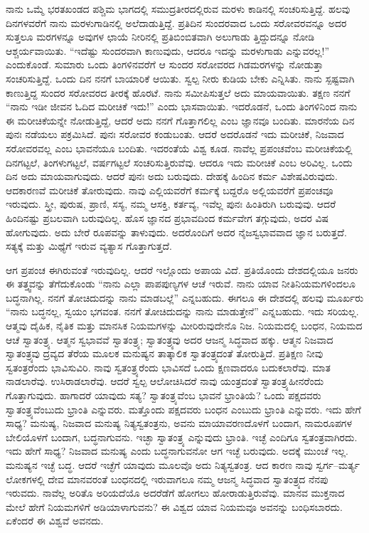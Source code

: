 ನಾನು ಒಮ್ಮೆ ಭರತಖಂಡದ ಪಶ್ಚಿಮ ಭಾಗದಲ್ಲಿ ಸಮುದ್ರತೀರದಲ್ಲಿರುವ ಮರಳು ಕಾಡಿನಲ್ಲಿ ಸಂಚರಿಸುತ್ತಿದ್ದೆ. ಹಲವು ದಿನಗಳವರೆಗೆ ನಾನು ಮರಳುಗಾಡಿನಲ್ಲಿ ಅಲೆದಾಡುತ್ತಿದ್ದೆ. ಪ್ರತಿದಿನ ಸುಂದರವಾದ ಒಂದು ಸರೋವರವನ್ನೂ ಅದರ ಸುತ್ತಲೂ ಮರಗಳನ್ನೂ ಅವುಗಳ ಛಾಯೆ ನೀರಿನಲ್ಲಿ ಪ್ರತಿಬಿಂಬಿತವಾಗಿ ಅಲುಗಾಡು ತ್ತಿದ್ದುದನ್ನೂ ನೋಡಿ ಆಶ್ಚರ್ಯವಾಯಿತು. “ಇದೆಷ್ಟು ಸುಂದರವಾಗಿ ಕಾಣುವುದು, ಆದರೂ ಇದನ್ನು ಮರಳುಗಾಡು ಎನ್ನುವರಲ್ಲ!” ಎಂದುಕೊಂಡೆ. ಸುಮಾರು ಒಂದು ತಿಂಗಳಿನವರೆಗೆ ಆ ಸುಂದರ ಸರೋವರದ ಗಿಡಮರಗಳನ್ನು ನೋಡುತ್ತಾ ಸಂಚರಿಸುತ್ತಿದ್ದೆ. ಒಂದು ದಿನ ನನಗೆ ಬಾಯಾರಿಕೆ ಆಯಿತು. ಸ್ವಲ್ಪ ನೀರು ಕುಡಿಯ ಬೇಕು ಎನ್ನಿಸಿತು. ನಾನು ಸ್ಪಷ್ಟವಾಗಿ ಕಾಣುತ್ತಿದ್ದ ಸುಂದರ ಸರೋವರದ ತೀರಕ್ಕೆ ಹೊರಟೆ. ನಾನು ಸಮೀಪಿಸುತ್ತಲೆ ಅದು ಮಾಯವಾಯಿತು. ತಕ್ಷಣ ನನಗೆ “ನಾನು ಇಡೀ ಜೀವನ ಓದಿದ ಮರೀಚಿಕೆ ಇದು!” ಎಂದು ಭಾಸವಾಯಿತು. ಇದರೊಡನೆ, ಒಂದು ತಿಂಗಳಿನಿಂದ ನಾನು ಈ ಮರೀಚಿಕೆಯನ್ನೇ ನೋಡುತ್ತಿದ್ದೆ, ಆದರೆ ಅದು ನನಗೆ ಗೊತ್ತಾಗಲಿಲ್ಲ ಎಂಬ ಜ್ಞಾನವೂ ಬಂದಿತು. ಮಾರನೆಯ ದಿನ ಪುನಃ ನಡೆಯಲು ಪಕ್ರಮಿಸಿದೆ. ಪುನಃ ಸರೋವರ ಕಂಡುಬಂತು. ಆದರೆ ಅದರೊಡನೆ ಇದು ಮರೀಚಿಕೆ, ನಿಜವಾದ ಸರೋವರವಲ್ಲ ಎಂಬ ಭಾವನೆಯೂ ಬಂದಿತು. ಇದರಂತೆಯೆ ವಿಶ್ವ ಕೂಡ. ನಾವೆಲ್ಲ ಪ್ರಪಂಚವೆಂಬ ಮರೀಚಿಕೆಯಲ್ಲಿ ದಿನಗಟ್ಟಲೆ, ತಿಂಗಳುಗಟ್ಟಲೆ, ವರ್ಷಗಟ್ಟಲೆ ಸಂಚರಿಸುತ್ತಿರುವೆವು. ಆದರೂ ಇದು ಮರೀಚಿಕೆ ಎಂಬ ಅರಿವಿಲ್ಲ. ಒಂದು ದಿನ ಅದು ಮಾಯವಾಗುವುದು. ಆದರೆ ಪುನಃ ಅದು ಬರುವುದು. ದೇಹಕ್ಕೆ ಹಿಂದಿನ ಕರ್ಮ ವಿಶೇಷವಿರುವುದು. ಆದಕಾರಣವೆ ಮರೀಚಿಕೆ ತೋರುವುದು. ನಾವು ಎಲ್ಲಿಯವರೆಗೆ ಕರ್ಮಕ್ಕೆ ಬದ್ದರೊ ಅಲ್ಲಿಯವರೆಗೆ ಪ್ರಪಂಚವೂ ಇರುವುದು. ಸ್ತ್ರೀ, ಪುರುಷ, ಪ್ರಾಣಿ, ಸಸ್ಯ, ನಮ್ಮ ಆಸಕ್ತಿ, ಕರ್ತವ್ಯ, ಇವೆಲ್ಲ ಪುನಃ ಹಿಂತಿರುಗಿ ಬರುವುವು. ಆದರೆ ಹಿಂದಿನಷ್ಟು ಪ್ರಬಲವಾಗಿ ಬರುವುದಿಲ್ಲ. ಹೊಸ ಜ್ಞಾನದ ಪ್ರಭಾವದಿಂದ ಕರ್ಮವೇಗ ತಗ್ಗುವುದು, ಅದರ ವಿಷ ಹೋಗುವುದು. ಅದು ಬೇರೆ ರೂಪವನ್ನು ತಾಳುವುದು. ಅದರೊಂದಿಗೆ ಅದರ ನೈಜಸ್ವಭಾವವಾದ ಜ್ಞಾನ ಬರುತ್ತದೆ. ಸತ್ಯಕ್ಕೆ ಮತ್ತು ಮಿಥ್ಯೆಗೆ ಇರುವ ವ್ಯತ್ಯಾಸ ಗೊತ್ತಾಗುತ್ತದೆ.

ಆಗ ಪ್ರಪಂಚ ಈಗಿರುವಂತೆ ಇರುವುದಿಲ್ಲ. ಆದರೆ ಇಲ್ಲೊಂದು ಅಪಾಯ ವಿದೆ. ಪ್ರತಿಯೊಂದು ದೇಶದಲ್ಲಿಯೂ ಜನರು ಈ ತತ್ತ್ವವನ್ನು ತೆಗೆದುಕೊಂಡು “ನಾನು ಎಲ್ಲಾ ಪಾಪಪುಣ್ಯಗಳ ಆಚೆ ಇರುವೆ. ನಾನು ಯಾವ ನೀತಿನಿಯಮಗಳಿಂದಲೂ ಬದ್ಧನಾಗಿಲ್ಲ. ನನಗೆ ತೋಚಿದುದನ್ನು ನಾನು ಮಾಡಬಲ್ಲೆ” ಎನ್ನಬಹುದು. ಈಗಲೂ ಈ ದೇಶದಲ್ಲಿ ಹಲವು ಮೂರ್ಖರು “ನಾನು ಬದ್ಧನಲ್ಲ, ಸ್ವಯಂ ಭಗವಂತ. ನನಗೆ ತೋಚಿದುದನ್ನು ನಾನು ಮಾಡುತ್ತೇನೆ” ಎನ್ನಬಹುದು. ಇದು ಸರಿಯಲ್ಲ. ಆತ್ಮವು ದೈಹಿಕ, ನೈತಿಕ ಮತ್ತು ಮಾನಸಿಕ ನಿಯಮಗಳನ್ನು ಮೀರಿರುವುದೇನೊ ನಿಜ. ನಿಯಮದಲ್ಲಿ ಬಂಧನ, ನಿಯಮದ ಆಚೆ ಸ್ವಾತಂತ್ರ್ಯ. ಆತ್ಮನ ಸ್ವಭಾವವೆ ಸ್ವಾತಂತ್ರ್ಯ; ಸ್ವಾತಂತ್ರ್ಯವು ಅದರ ಆಜನ್ಮ ಸಿದ್ಧವಾದ ಹಕ್ಕು. ಆತ್ಮನ ನಿಜವಾದ ಸ್ವಾತಂತ್ರ್ಯವು ದ್ರವ್ಯದ ತೆರೆಯ ಮೂಲಕ ಮನುಷ್ಯನ ತಾತ್ಕಾಲಿಕ ಸ್ವಾತಂತ್ರ್ಯದಂತೆ ತೋರುತ್ತಿದೆ. ಪ್ರತಿಕ್ಷಣ ನೀವು ಸ್ವತಂತ್ರರೆಂದು ಭಾವಿಸುವಿರಿ. ನಾವು ಸ್ವತಂತ್ರ್ಯರೆಂದು ಭಾವಿಸದೆ ಒಂದು ಕ್ಷಣವಾದರೂ ಬದುಕಲಾರೆವು. ಮಾತ ನಾಡಲಾರೆವು. ಉಸಿರಾಡಲಾರೆವು. ಆದರೆ ಸ್ವಲ್ಪ ಆಲೋಚಿಸಿದರೆ ನಾವು ಯಂತ್ರದಂತೆ ಸ್ವಾತಂತ್ರ್ಯಹೀನರೆಂದು ಗೊತ್ತಾಗುವುದು. ಹಾಗಾದರೆ ಯಾವುದು ಸತ್ಯ? ಸ್ವಾತಂತ್ರ್ಯವೆಂಬ ಭಾವನೆ ಭ್ರಾಂತಿಯೆ? ಒಂದು ಪಕ್ಷದವರು ಸ್ವಾತಂತ್ರ್ಯವೆಂಬುದು ಭ್ರಾಂತಿ ಎನ್ನುವರು. ಮತ್ತೊಂದು ಪಕ್ಷದವರು ಬಂಧನ ಎಂಬುದು ಭ್ರಾಂತಿ ಎನ್ನುವರು. ಇದು ಹೇಗೆ ಸಾಧ್ಯ? ಮನುಷ್ಯ, ನಿಜವಾದ ಮನುಷ್ಯ ನಿತ್ಯಸ್ವತಂತ್ರನು, ಅವನು ಮಾಯಾವರಣದೊಳಗೆ ಬಂದಾಗ, ನಾಮರೂಪಗಳ ಬೇಲಿಯೊಳಗೆ ಬಂದಾಗ, ಬದ್ಧನಾಗುವನು. ಇಚ್ಛಾ ಸ್ವಾತಂತ್ರ್ಯ ಎನ್ನುವುದು ಭ್ರಾಂತಿ. ಇಚ್ಛೆ ಎಂದಿಗೂ ಸ್ವತಂತ್ರವಾಗಿರದು. ಇದು ಹೇಗೆ ಸಾಧ್ಯ? ನಿಜವಾದ ಮನುಷ್ಯ ಎಂದು ಬದ್ಧನಾಗುವನೋ ಆಗ ಇಚ್ಛೆ ಬರುವುದು. ಅದಕ್ಕೆ ಮುಂಚೆ ಇಲ್ಲ. ಮನುಷ್ಯನ ಇಚ್ಛೆ ಬದ್ಧ. ಆದರೆ ಇಚ್ಛೆಗೆ ಯಾವುದು ಮೂಲವೊ ಅದು ನಿತ್ಯಸ್ವತಂತ್ರ. ಆದ ಕಾರಣ ನಾವು ಸ್ವರ್ಗ–ಮರ್ತ್ಯ ಲೋಕಗಳಲ್ಲಿ ದೇವ ಮಾನವರಂತೆ ಬಂಧನದಲ್ಲಿ ಇರುವಾಗಲೂ ನಮ್ಮ ಆಜನ್ಮ ಸಿದ್ಧವಾದ ಸ್ವಾತಂತ್ರ್ಯದ ನೆನಪು ಇರುವದು. ನಾವೆಲ್ಲ ಅರಿತೊ ಅರಿಯದೆಯೊ ಅದರೆಡೆಗೆ ಹೋಗಲು ಹೋರಾಡುತ್ತಿರುವೆವು. ಮಾನವ ಮುಕ್ತನಾದ ಮೇಲೆ ಹೇಗೆ ನಿಯಮಗಳಿಗೆ ಅಡಿಯಾಳಾಗುವನು? ಈ ವಿಶ್ವದ ಯಾವ ನಿಯಮವೂ ಅವನನ್ನು ಬಂಧಿಸಬಾರದು. ಏಕೆಂದರೆ ಈ ವಿಶ್ವವೆ ಅವನದು.

